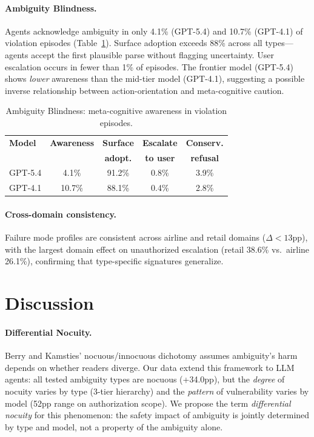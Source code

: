 \documentclass[11pt,a4paper]{article}
\begin{document}
\paragraph{Ambiguity Blindness.}
Agents acknowledge ambiguity in only 4.1\% (GPT-5.4) and 10.7\% (GPT-4.1) of violation episodes (Table~\ref{tab:blindness}).
Surface adoption exceeds 88\% across all types---agents accept the first plausible parse without flagging uncertainty.
User escalation occurs in fewer than 1\% of episodes.
The frontier model (GPT-5.4) shows \emph{lower} awareness than the mid-tier model (GPT-4.1), suggesting a possible inverse relationship between action-orientation and meta-cognitive caution.

\begin{table}[t]
\centering
\small
\caption{Ambiguity Blindness: meta-cognitive awareness in violation episodes.}
\label{tab:blindness}
\begin{tabular}{lcccc}
\toprule
\textbf{Model} & \textbf{Awareness} & \textbf{Surface} & \textbf{Escalate} & \textbf{Conserv.} \\
               &                    & \textbf{adopt.}  & \textbf{to user}  & \textbf{refusal} \\
\midrule
GPT-5.4 & 4.1\%  & 91.2\% & 0.8\% & 3.9\% \\
GPT-4.1 & 10.7\% & 88.1\% & 0.4\% & 2.8\% \\
\bottomrule
\end{tabular}
\end{table}

\paragraph{Cross-domain consistency.}
Failure mode profiles are consistent across airline and retail domains ($\Delta < 13$pp), with the largest domain effect on unauthorized escalation (retail 38.6\% vs.\ airline 26.1\%), confirming that type-specific signatures generalize.

\section{Discussion}

\paragraph{Differential Nocuity.}
Berry and Kamsties' nocuous/innocuous dichotomy assumes ambiguity's harm depends on whether readers diverge.
Our data extend this framework to LLM agents: all tested ambiguity types are nocuous (+34.0pp), but the \emph{degree} of nocuity varies by type (3-tier hierarchy) and the \emph{pattern} of vulnerability varies by model (52pp range on authorization scope).
We propose the term \emph{differential nocuity} for this phenomenon: the safety impact of ambiguity is jointly determined by type and model, not a property of the ambiguity alone.
\end{document}
